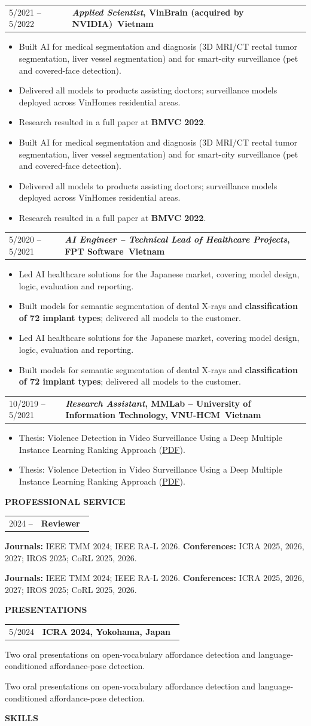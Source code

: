 \documentclass[10pt,a4paper]{article}
\makeatletter
\newcommand{\link}[2]{\href{#1}{\textcolor{linkblue}{#2}}}
\newcommand{\cvsection}[1]{%
  \vspace{10pt}\par\Needspace{6\baselineskip}\noindent
  {\small\bfseries\MakeUppercase{#1}}%
  \hspace{6pt}{\color{rulegray}\leaders\hrule height 0.6pt\hfill\kern0pt}%
  \par\vspace{6pt}%
}
\newlength{\datecol}\setlength{\datecol}{1.12in}
\newlength{\colgap}\setlength{\colgap}{8pt}
\newcommand{\cventryhead}[3]{%
  \noindent
  \begin{tabularx}{\linewidth}{@{}p{\datecol}@{\hspace{\colgap}}X@{}}
    \small #1 & \textbf{#2}\hfill{\scriptsize\bfseries\ #3} \\
  \end{tabularx}\par}
\newcommand{\cventry}[4]{%
  \Needspace{3\baselineskip}%
  \cventryhead{#1}{#2}{#3}%
  \def\cvbody{#4}%
  \ifx\cvbody\empty\else
    \vspace{1pt}\noindent\hspace*{\dimexpr\datecol+\colgap\relax}%
    \begin{minipage}[t]{\dimexpr\linewidth-\datecol-\colgap\relax}#4\end{minipage}\par
  \fi
  \vspace{8pt}%
}
\newenvironment{cvitems}{%
  \begin{itemize}[leftmargin=12pt,nosep,
                  label={\textcolor{gray}{\scriptsize$\bullet$}}]\small
}{\end{itemize}}
\makeatother
\begin{document}
\cventry{5/2021 -- 5/2022}
  {\textit{Applied Scientist}, VinBrain (acquired by NVIDIA)}{Vietnam}
  {\begin{cvitems}
    \item Built AI for medical segmentation and diagnosis (3D MRI/CT rectal tumor segmentation, liver vessel segmentation) and for smart-city surveillance (pet and covered-face detection).
    \item Delivered all models to products assisting doctors; surveillance models deployed across VinHomes residential areas.
    \item Research resulted in a full paper at \textbf{BMVC 2022}.
  \end{cvitems}}

\cventry{5/2020 -- 5/2021}
  {\textit{AI Engineer -- Technical Lead of Healthcare Projects}, FPT Software}{Vietnam}
  {\begin{cvitems}
    \item Led AI healthcare solutions for the Japanese market, covering model design, logic, evaluation and reporting.
    \item Built models for semantic segmentation of dental X-rays and \textbf{classification of 72 implant types}; delivered all models to the customer.
  \end{cvitems}}

\cventry{10/2019 -- 5/2021}
  {\textit{Research Assistant}, MMLab -- University of Information Technology, VNU-HCM}{Vietnam}
  {\begin{cvitems}
    \item Thesis: Violence Detection in Video Surveillance Using a Deep Multiple Instance Learning Ranking Approach
          (\link{https://drive.google.com/file/d/1p_yap1vRivDxcnIOtcySKQjHD0818yhq/view?usp=sharing}{PDF}).
  \end{cvitems}}

\cvsection{Professional Service}

\cventry{2024 --}
  {Reviewer}{}
  {\textbf{Journals:} IEEE TMM 2024; IEEE RA-L 2026.\newline
   \textbf{Conferences:} ICRA 2025, 2026, 2027; IROS 2025; CoRL 2025, 2026.}

\cvsection{Presentations}

\cventry{5/2024}
  {ICRA 2024, Yokohama, Japan}{}
  {Two oral presentations on open-vocabulary affordance detection and language-conditioned affordance-pose detection.}

\cvsection{Skills}
\end{document}
